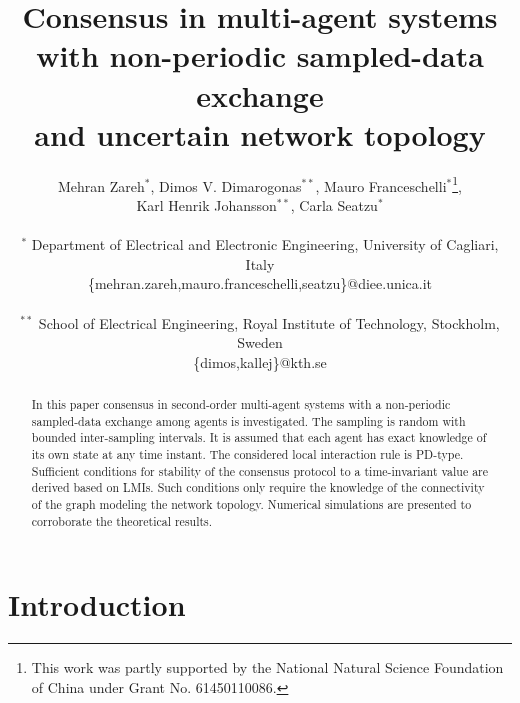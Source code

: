 \documentclass[conference]{IEEEtran}
\begin{document}
\title{Consensus in multi-agent systems \\ with non-periodic sampled-data exchange \\ and uncertain network topology}

\author{Mehran Zareh$^*$, Dimos V. Dimarogonas$^{**}$, Mauro Franceschelli$^*$\thanks{This work was partly supported by the National Natural Science Foundation of China under Grant No. 61450110086.},\\ Karl Henrik Johansson$^{**}$, Carla Seatzu$^*$
\\~\\
$^{*}$ Department of Electrical and Electronic Engineering, University of Cagliari, Italy \\
\{mehran.zareh,mauro.franceschelli,seatzu\}@diee.unica.it \\~\\
$^{**}$ School of Electrical Engineering, Royal Institute of Technology, Stockholm, Sweden \\ \{dimos,kallej\}@kth.se}
\maketitle






\begin{abstract} In this paper consensus in second-order multi-agent
systems with a non-periodic sampled-data exchange among agents is investigated. The sampling is random with bounded inter-sampling intervals. It is assumed that each agent has exact knowledge of its own state at any time instant. The considered local interaction rule is PD-type. Sufficient conditions for stability of the consensus protocol to a time-invariant value are derived based on LMIs. Such conditions only require the knowledge of the connectivity of the graph modeling the network topology. Numerical simulations are presented to corroborate the theoretical results.
\end{abstract}

\IEEEpeerreviewmaketitle

\section{Introduction}
\end{document}

